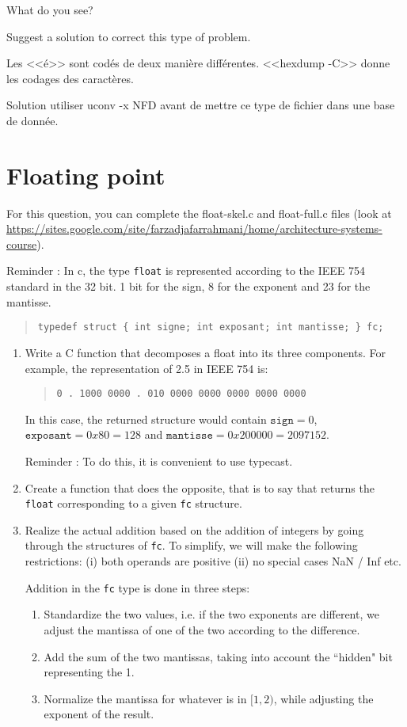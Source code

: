 \documentclass[11pt]{article}
\begin{document}
What do you see? 

Suggest a solution to correct this type of problem.


\begin{solution}
Les <<é>> sont codés de deux manière différentes. <<hexdump -C>> donne les codages des caractères.

Solution utiliser uconv -x NFD avant de mettre ce type de fichier dans une base de donnée.
\end{solution}


\section{Floating point}

For this question, you can complete the float-skel.c  and  float-full.c files (look at \url{https://sites.google.com/site/farzadjafarrahmani/home/architecture-systems-course}).


Reminder : In c, the type \texttt{float} is represented according to the IEEE 754 standard in the 32 bit. 1 bit for the sign, 8 for the exponent and 23 for the mantisse. 

\begin{quote}
\verb+typedef struct { int signe; int exposant; int mantisse; } fc;+
\end{quote}


\begin{enumerate}
\item Write a C function that decomposes a float into its three components. For example, the representation of  2.5 in IEEE 754 is:
\begin{quote}
\verb+0 . 1000 0000 . 010 0000 0000 0000 0000 0000+
\end{quote}
In this case, the returned structure would contain $\mathtt{sign}=0$, $\mathtt{exposant}=0x80=128$ and $\mathtt{mantisse}=0x200000=2097152$.

Reminder : To do this, it is convenient to use typecast. 


\item Create a function that does the opposite, that is to say that returns the \texttt{float} corresponding to a given \verb+fc+ structure.


\item Realize the actual addition based on the addition of integers by going through the structures of \verb+fc+. To simplify, we will make the following restrictions: (i) both operands are positive
  (ii) no special cases NaN / Inf etc.

Addition in the \verb+fc+ type is done in three steps:
\begin{enumerate}
\item Standardize the two values, i.e. if the two exponents are
different, we adjust the mantissa of one of the two according to the
difference.
\item Add the sum of the two mantissas, taking into account the  ``hidden" bit
representing the 1.
\item Normalize the mantissa for whatever is in $[1,2)$, while adjusting
the exponent of the result.
\end{enumerate}

\end{enumerate}
\end{document}
